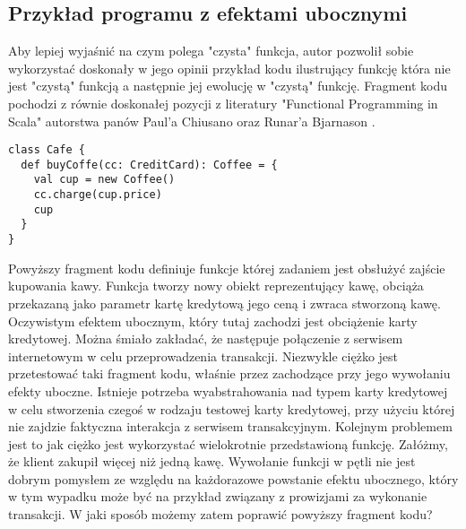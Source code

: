 \documentclass[../main.tex]{subfiles}
\begin{document}
\subsection{Przykład programu z efektami ubocznymi}
Aby lepiej wyjaśnić na czym polega "czysta" funkcja, autor pozwolił sobie wykorzystać doskonały w jego opinii przykład kodu ilustrujący funkcję która nie jest "czystą" funkcją a następnie jej ewolucję w "czystą" funkcję. Fragment kodu pochodzi z równie doskonałej pozycji z literatury "Functional Programming in Scala" autorstwa panów Paul'a Chiusano oraz Runar'a Bjarnason \cite{BOOK:FPinScala}.

\begin{lstlisting}[caption=Funkcja z efektami ubocznymi. Przykład zaczerpnięty z \cite{BOOK:FPinScala}]
class Cafe { 
  def buyCoffe(cc: CreditCard): Coffee = {
    val cup = new Coffee()
    cc.charge(cup.price)
    cup
  }
}
\end{lstlisting}
Powyższy fragment kodu definiuje funkcje której zadaniem jest obsłużyć zajście kupowania kawy.
Funkcja tworzy nowy obiekt reprezentujący kawę, obciąża przekazaną jako parametr kartę kredytową jego ceną i zwraca stworzoną kawę. Oczywistym efektem ubocznym, który tutaj zachodzi jest obciążenie karty kredytowej. Można śmiało zakładać, że następuje połączenie z serwisem internetowym w celu przeprowadzenia transakcji. Niezwykle ciężko jest przetestować taki fragment kodu, właśnie przez zachodzące przy jego wywołaniu efekty uboczne. Istnieje potrzeba wyabstrahowania nad typem karty kredytowej w celu stworzenia czegoś w rodzaju testowej karty kredytowej, przy użyciu której nie zajdzie faktyczna interakcja z serwisem transakcyjnym. Kolejnym problemem jest to jak ciężko jest wykorzystać wielokrotnie przedstawioną funkcję. Załóżmy, że klient zakupił więcej niż jedną kawę. Wywołanie funkcji w pętli nie jest dobrym pomysłem ze względu na każdorazowe powstanie efektu ubocznego, który w tym wypadku może być na przykład związany z prowizjami za wykonanie transakcji. W jaki sposób możemy zatem poprawić powyższy fragment kodu?
\end{document}

